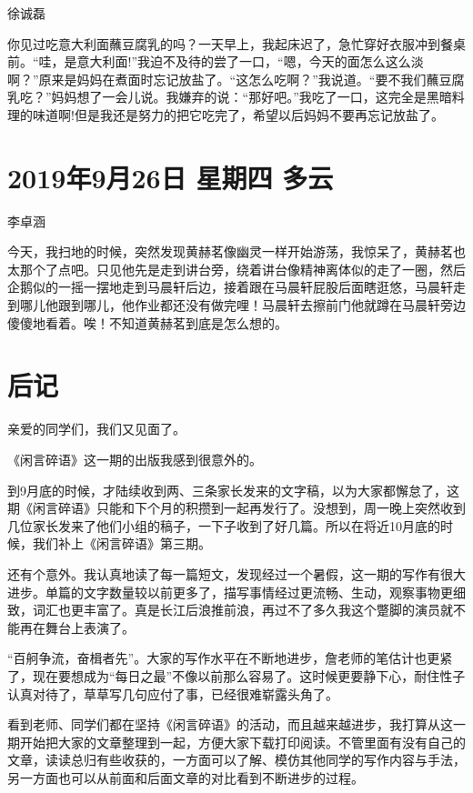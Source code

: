 徐诚磊

你见过吃意大利面蘸豆腐乳的吗？一天早上，我起床迟了，急忙穿好衣服冲到餐桌前。``哇，是意大利面!''我迫不及待的尝了一口，``嗯，今天的面怎么这么淡啊？''原来是妈妈在煮面时忘记放盐了。``这怎么吃啊？''我说道。``要不我们蘸豆腐乳吃？''妈妈想了一会儿说。我嫌弃的说：``那好吧。''我吃了一口，这完全是黑暗料理的味道啊!但是我还是努力的把它吃完了，希望以后妈妈不要再忘记放盐了。

\section{2019年9月26日 星期四 多云}

李卓涵

今天，我扫地的时候，突然发现黄赫茗像幽灵一样开始游荡，我惊呆了，黄赫茗也太那个了点吧。只见他先是走到讲台旁，绕着讲台像精神离体似的走了一圈，然后企鹅似的一摇一摆地走到马晨轩后边，接着跟在马晨轩屁股后面瞎逛悠，马晨轩走到哪儿他跟到哪儿，他作业都还没有做完哩！马晨轩去擦前门他就蹲在马晨轩旁边傻傻地看着。唉！不知道黄赫茗到底是怎么想的。

\section{后记}

亲爱的同学们，我们又见面了。

《闲言碎语》这一期的出版我感到很意外的。

到9月底的时候，才陆续收到两、三条家长发来的文字稿，以为大家都懈怠了，这期《闲言碎语》只能和下个月的积攒到一起再发行了。没想到，周一晚上突然收到几位家长发来了他们小组的稿子，一下子收到了好几篇。所以在将近10月底的时候，我们补上《闲言碎语》第三期。

还有个意外。我认真地读了每一篇短文，发现经过一个暑假，这一期的写作有很大进步。单篇的文字数量较以前更多了，描写事情经过更流畅、生动，观察事物更细致，词汇也更丰富了。真是长江后浪推前浪，再过不了多久我这个蹩脚的演员就不能再在舞台上表演了。

``百舸争流，奋楫者先''。大家的写作水平在不断地进步，詹老师的笔估计也更紧了，现在要想成为``每日之最''不像以前那么容易了。这时候更要静下心，耐住性子认真对待了，草草写几句应付了事，已经很难崭露头角了。

看到老师、同学们都在坚持《闲言碎语》的活动，而且越来越进步，我打算从这一期开始把大家的文章整理到一起，方便大家下载打印阅读。不管里面有没有自己的文章，读读总归有些收获的，一方面可以了解、模仿其他同学的写作内容与手法，另一方面也可以从前面和后面文章的对比看到不断进步的过程。
